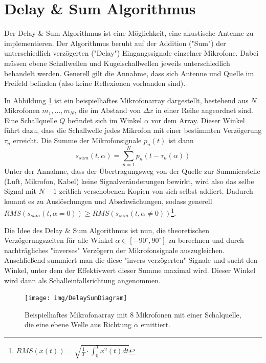 \section{Delay \& Sum Algorithmus}

	Der Delay \& Sum Algorithmus ist eine Möglichkeit, eine akustische Antenne zu implementieren. Der Algorithmus beruht auf der Addition ("Sum") der unterschiedlich verzögerten ("Delay") Eingangssignale einzelner Mikrofone. Dabei müssen ebene Schallwellen und Kugelschallwellen jeweils unterschiedlich behandelt werden. Generell gilt die Annahme, dass sich Antenne und Quelle im Freifeld befinden (also keine Reflexionen vorhanden sind).
	
	In Abbildung \ref{fig:das_basic} ist ein beispielhaftes Mikrofonarray dargestellt, bestehend aus $N$ Mikrofonen $m_1,...,m_N$, die im Abstand von $\Delta x$ in einer Reihe angeordnet sind. Eine Schallquelle $Q$ befindet sich im Winkel $\alpha$ vor dem Array.
	Dieser Winkel führt dazu, dass die Schallwelle jedes Mikrofon mit einer bestimmten Verzögerung $\tau_n$ erreicht.
	Die Summe der Mikrofonsignale $p_n(t)$ ist dann
	\begin{equation}
		s_{sum}(t, \alpha) = \sum_{n=1}^{N} p_n(t - \tau_n(\alpha))
	\end{equation}
	Unter der Annahme, dass der Übertragungsweg von der Quelle zur Summierstelle (Luft, Mikrofon, Kabel) keine Signalveränderungen bewirkt, wird also das selbe Signal mit $N-1$ zeitlich verschobenen Kopien von sich selbst addiert.
	Dadurch kommt es zu Auslöschungen und Abschwächungen, sodass generell $RMS(s_{sum}(t, \alpha=0)) \ge RMS(s_{sum}(t, \alpha \ne 0))$\footnote{$RMS(x(t)) = \sqrt{\frac{1}{T} \cdot \int_{0}^{T} x^2(t) dt }$}.
	
	Die Idee des Delay \& Sum Algorithmus ist nun, die theoretischen Verzögerungszeiten für alle Winkel $\alpha \in [-90^{\circ}, 90^{\circ}]$ zu berechnen und durch nachträgliches "inverses" Verzögern der Mikrofonsignale auszugleichen.
	Anschließend summiert man die diese "invers verzögerten" Signale und sucht den Winkel, unter dem der Effektivwert dieser Summe maximal wird.
	Dieser Winkel wird dann als Schalleinfallsrichtung angenommen.
	
	\begin{figure}[h]
		\begin{center}
		\texttt{[image: img/DelaySumDiagram]}
		\caption{Beispielhaftes Mikrofonarray mit 8 Mikrofonen mit einer Schalquelle, die eine ebene Welle aus Richtung $\alpha$ emittiert.}
		\label{fig:das_basic}
		\end{center}		
	\end{figure}

